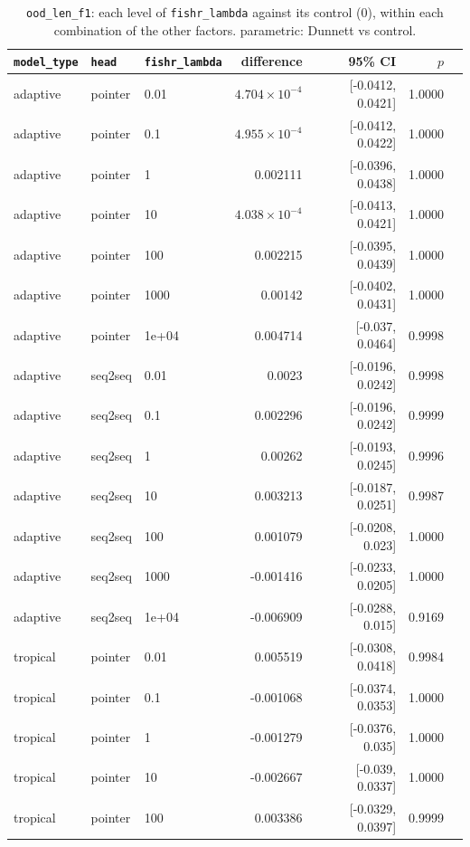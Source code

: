 \documentclass[10pt]{article}
\begin{document}
{\small
\begin{longtable}{lllrrrl}
\caption{\texttt{ood\_len\_f1}: each level of \texttt{fishr\_lambda} against its control (0), within each combination of the other factors. parametric: Dunnett vs control.}\label{tab:control-ood_len_f1}\\
\toprule
\texttt{model\_type} & \texttt{head} & \texttt{fishr\_lambda} & difference & 95\% CI & $p$ & \\
\midrule
\endhead
adaptive & pointer & 0.01 & $4.704\times10^{-4}$ & [-0.0412, 0.0421] & 1.0000 & \\
adaptive & pointer & 0.1 & $4.955\times10^{-4}$ & [-0.0412, 0.0422] & 1.0000 & \\
adaptive & pointer & 1 & 0.002111 & [-0.0396, 0.0438] & 1.0000 & \\
adaptive & pointer & 10 & $4.038\times10^{-4}$ & [-0.0413, 0.0421] & 1.0000 & \\
adaptive & pointer & 100 & 0.002215 & [-0.0395, 0.0439] & 1.0000 & \\
adaptive & pointer & 1000 & 0.00142 & [-0.0402, 0.0431] & 1.0000 & \\
adaptive & pointer & 1e+04 & 0.004714 & [-0.037, 0.0464] & 0.9998 & \\
adaptive & seq2seq & 0.01 & 0.0023 & [-0.0196, 0.0242] & 0.9998 & \\
adaptive & seq2seq & 0.1 & 0.002296 & [-0.0196, 0.0242] & 0.9999 & \\
adaptive & seq2seq & 1 & 0.00262 & [-0.0193, 0.0245] & 0.9996 & \\
adaptive & seq2seq & 10 & 0.003213 & [-0.0187, 0.0251] & 0.9987 & \\
adaptive & seq2seq & 100 & 0.001079 & [-0.0208, 0.023] & 1.0000 & \\
adaptive & seq2seq & 1000 & -0.001416 & [-0.0233, 0.0205] & 1.0000 & \\
adaptive & seq2seq & 1e+04 & -0.006909 & [-0.0288, 0.015] & 0.9169 & \\
tropical & pointer & 0.01 & 0.005519 & [-0.0308, 0.0418] & 0.9984 & \\
tropical & pointer & 0.1 & -0.001068 & [-0.0374, 0.0353] & 1.0000 & \\
tropical & pointer & 1 & -0.001279 & [-0.0376, 0.035] & 1.0000 & \\
tropical & pointer & 10 & -0.002667 & [-0.039, 0.0337] & 1.0000 & \\
tropical & pointer & 100 & 0.003386 & [-0.0329, 0.0397] & 0.9999 & \\

\end{longtable}}
\end{document}
